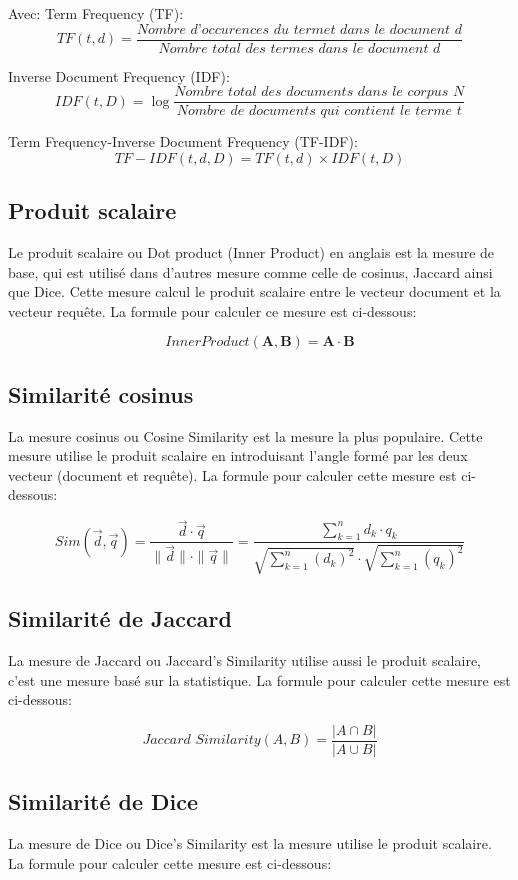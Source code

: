 Avec:
Term Frequency (TF):
\[
    TF(t, d) = \frac{\textit{Nombre d'occurences du terme} t \textit{ dans le document } d}{\textit{Nombre total des termes dans le document } d}
\]

Inverse Document Frequency (IDF):
\[
    IDF(t, D) = \log\frac{\textit{Nombre total des documents dans le corpus } N}{\textit{Nombre de documents qui contient le terme } t}
\]

Term Frequency-Inverse Document Frequency (TF-IDF):
\[
    TF-IDF(t, d, D) = \textit{TF}(t, d) \times \textit{IDF}(t, D)
\]

\subsection{Produit scalaire}
Le produit scalaire ou Dot product (Inner Product) en anglais est la mesure de base, qui est utilisé dans d'autres mesure comme celle de cosinus, Jaccard ainsi que Dice. Cette mesure calcul le produit scalaire entre le vecteur document et la vecteur requête. La formule pour calculer ce mesure est ci-dessous:

\[
    Inner Product(\mathbf{A}, \mathbf{B}) = \mathbf{A} \cdot \mathbf{B}
\]

\subsection{Similarité cosinus}
La mesure cosinus ou Cosine Similarity est la mesure la plus populaire. Cette mesure utilise le produit scalaire en introduisant l'angle formé par les deux vecteur (document et requête). La formule pour calculer cette mesure est ci-dessous:

\[
    Sim(\vec{d}, \vec{q}) = \frac{\vec{d} \cdot \vec{q}}{\|\vec{d}\| \cdot \|\vec{q}\|} = \frac{\sum_{k=1}^{n} d_{k} \cdot q_{k}}{\sqrt{\sum_{k=1}^{n} (d_{k})^2} \cdot \sqrt{\sum_{k=1}^{n} (q_{k})^2}}
\]

\subsection{Similarité de Jaccard}
La mesure de Jaccard ou Jaccard's Similarity utilise aussi le produit scalaire, c'est une mesure basé sur la statistique. La formule pour calculer cette mesure est ci-dessous:

\[
    \textit{Jaccard Similarity}(A, B) = \frac{|A \cap B|}{|A \cup B|}
\]

\subsection{Similarité de Dice}
La mesure de Dice ou Dice's Similarity est la mesure utilise le produit scalaire. La formule pour calculer cette mesure est ci-dessous:

